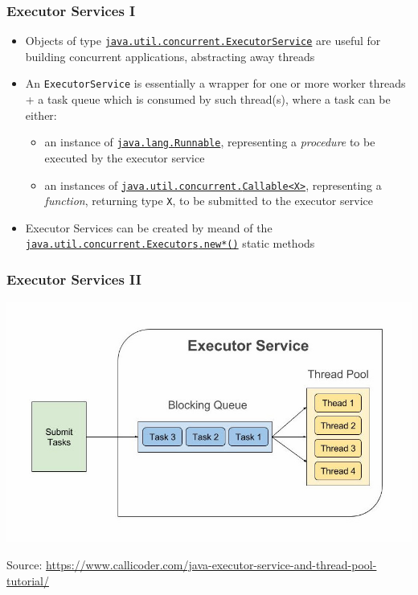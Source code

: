 \documentclass{beamer}\mode<presentation>{\usetheme{AMSCesenaPurpleAndGold}}
\begin{document}
\begin{frame}
\frametitle{Executor Services I}

\begin{itemize}
	\item Objects of type \href{https://docs.oracle.com/javase/8/docs/api/java/util/concurrent/ExecutorService.html}{\texttt{java.util.concurrent.\alert{ExecutorService}}} are useful for building \alert{concurrent} applications, abstracting away threads 
	
	\vfill
	
	\item An \alert{\texttt{ExecutorService}} is essentially a wrapper for one or more \alert{worker} threads + a \alert{task queue} which is consumed by such thread(s), where a task can be either:
	\begin{itemize}
		\item an instance of \href{https://docs.oracle.com/javase/8/docs/api/java/lang/Runnable.html}{\texttt{java.lang.\alert{Runnable}}}, representing a \emph{procedure} to be \alert{executed} by the executor service
		
		\item an instances of \href{https://docs.oracle.com/javase/8/docs/api/java/util/concurrent/Callable.html}{\texttt{java.util.concurrent.\alert{Callable<X>}}}, representing a \emph{function}, returning type \texttt{X}, to be \alert{submitted} to the executor service
	\end{itemize}
	
	\vfill
	
	\item Executor Services can be created by meand of the \href{https://docs.oracle.com/javase/8/docs/api/java/util/concurrent/Executors.html}{\texttt{java.util.concurrent.Executor\alert{s}.new*()}} static methods
\end{itemize}
\end{frame}

\begin{frame}
\frametitle{Executor Services II}
\begin{center}
\includegraphics[width=.9\linewidth]{img/executor_service.jpg}

{\tiny Source: \url{https://www.callicoder.com/java-executor-service-and-thread-pool-tutorial/}}
\end{center}

\end{frame}
\end{document}
